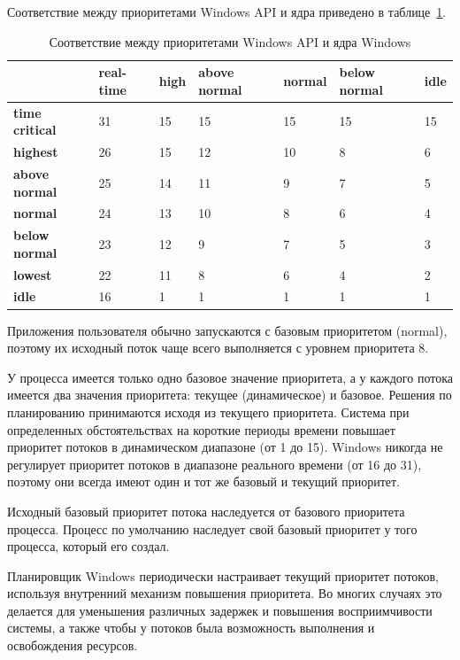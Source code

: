 \documentclass[a4paper, 12pt]{extreport}
\begin{document}
Соответствие между приоритетами Windows API и ядра приведено в таблице~\ref{tbl:priority}.
\begin{table}[h]
	\caption{Соответствие между приоритетами Windows API и ядра Windows}
	\begin{center}
		\begin{tabular}{|l|p{45pt}|p{45pt}|p{45pt}|p{45pt}|p{45pt}|p{45pt}|} 
			\hline
			{} & \textbf{real-time} & \textbf{high} & \textbf{above normal} & \textbf{normal} & \textbf{below normal} & 
			\textbf{idle}\\
			\hline
			\textbf{time critical} & 31 & 15 & 15 & 15 & 15 & 15 \\
			\hline
			\textbf{highest} & 26 & 15 & 12 & 10 & 8 & 6 \\
			\hline
			\textbf{above normal} & 25 & 14 & 11 & 9 & 7 & 5 \\
			\hline
			\textbf{normal} & 24 & 13 & 10 & 8 & 6 & 4 \\
			\hline
			\textbf{below normal} & 23 & 12 & 9 & 7 & 5 & 3 \\
			\hline
			\textbf{lowest} & 22 & 11 & 8 & 6 & 4 & 2 \\
			\hline
			\textbf{idle} & 16 & 1 & 1 & 1 & 1 & 1 \\
			\hline
		\end{tabular}
	\end{center}
	\label{tbl:priority}
\end{table}

Приложения пользователя обычно запускаются с базовым приоритетом (normal), поэтому их исходный поток чаще всего 
выполняется с уровнем приоритета 8. 

У процесса имеется только одно базовое значение приоритета, а у каждого потока имеется два значения приоритета: текущее 
(динамическое) и базовое. Решения по планированию принимаются исходя из текущего приоритета. Система при определенных 
обстоятельствах на короткие периоды времени повышает приоритет потоков в динамическом диапазоне (от 1 до 15). Windows 
никогда не регулирует приоритет потоков в диапазоне реального времени (от 16 до 31), поэтому они всегда имеют один и тот 
же базовый и текущий приоритет.

Исходный базовый приоритет потока наследуется от базового приоритета процесса. Процесс по умолчанию наследует свой 
базовый приоритет у того процесса, который его создал.

Планировщик Windows периодически настраивает текущий приоритет потоков, используя внутренний механизм повышения 
приоритета. Во многих случаях это делается для уменьшения различных задержек и повышения восприимчивости системы, а 
также чтобы у потоков была возможность выполнения и освобождения ресурсов.  
\end{document}
